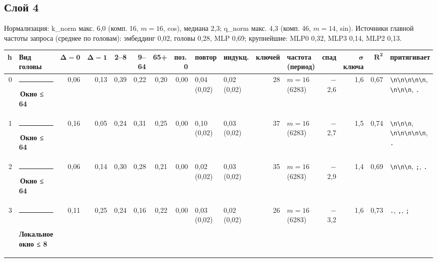 \documentclass[10pt]{article}
\begin{document}
\par\vspace{0.4em}
\noindent\begin{minipage}{\linewidth}
\subsection*{Слой 4}
{\small\color{ink2} Нормализация: k\_norm макс. 6,0 (комп. 16, $m{=}16$, cos), медиана 2,3; q\_norm макс. 4,3 (комп. 46, $m{=}14$, sin). Источники главной частоты запроса (среднее по головам): эмбеддинг 0,02, головы 0,28, MLP 0,69; крупнейшие: MLP0 0,32, MLP3 0,14, MLP2 0,13.}
\begin{center}{\footnotesize\begin{tabular}{|r|l|r|r|r|r|r|r|l|l|r|l|r|r|r|l|}
\hline
\rowcolor{head}\textbf{h} & \textbf{Вид головы} & $\boldsymbol{\Delta{=}0}$ & $\boldsymbol{\Delta{=}1}$ & \textbf{2–8} & \textbf{9–64} & \textbf{65+} & \textbf{поз.\,0} & \textbf{повтор} & \textbf{индукц.} & \textbf{ключей} & \textbf{частота (период)} & \textbf{спад} & $\boldsymbol{\sigma}$ \textbf{ключа} & $\boldsymbol{R^2}$ & \textbf{притягивает} \\ \hline
0 & \textcolor[HTML]{EDA100}{\rule{0.62em}{0.62em}}\,\textbf{Окно ≤ 64} & 0,06 & 0,13 & 0,39 & 0,22 & 0,20 & 0,00 & 0,04 (0,02) & 0,02 (0,02) & 28 & $m{=}16$ (6283) & $-$2,6 & 1,6 & 0,67 & \texttt{\textbackslash{}n\textbackslash{}n\textbackslash{}n\textbackslash{}n\textbackslash{}n}, \texttt{\textvisiblespace{}\textbackslash{}n\textbackslash{}n\textbackslash{}n}, \texttt{\textvisiblespace{}.} \\ \hline
1 & \textcolor[HTML]{EDA100}{\rule{0.62em}{0.62em}}\,\textbf{Окно ≤ 64} & 0,16 & 0,05 & 0,24 & 0,31 & 0,25 & 0,00 & 0,10 (0,02) & 0,03 (0,02) & 37 & $m{=}16$ (6283) & $-$2,7 & 1,5 & 0,74 & \texttt{\textvisiblespace{}\textbackslash{}n\textbackslash{}n\textbackslash{}n}, \texttt{\textbackslash{}n\textbackslash{}n\textbackslash{}n\textbackslash{}n\textbackslash{}n}, \texttt{\textvisiblespace{}.} \\ \hline
2 & \textcolor[HTML]{EDA100}{\rule{0.62em}{0.62em}}\,\textbf{Окно ≤ 64} & 0,06 & 0,14 & 0,30 & 0,28 & 0,21 & 0,00 & 0,02 (0,02) & 0,03 (0,02) & 35 & $m{=}16$ (6283) & $-$2,9 & 1,4 & 0,69 & \texttt{\textvisiblespace{}\textbackslash{}n\textbackslash{}n\textbackslash{}n}, \texttt{\textvisiblespace{};}, \texttt{\textvisiblespace{}.} \\ \hline
3 & \textcolor[HTML]{1BAF7A}{\rule{0.62em}{0.62em}}\,\textbf{Локальное окно ≤ 8} & 0,11 & 0,25 & 0,24 & 0,16 & 0,22 & 0,00 & 0,03 (0,02) & 0,02 (0,02) & 26 & $m{=}16$ (6283) & $-$3,2 & 1,6 & 0,73 & \texttt{\textvisiblespace{}.}, \texttt{\textvisiblespace{},}, \texttt{\textvisiblespace{};} \\ \hline

\end{tabular}}
\end{center}
\end{minipage}
\end{document}
